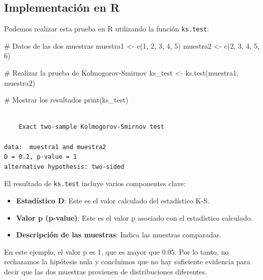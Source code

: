 \documentclass[
  letterpaper,
  DIV=11,
  numbers=noendperiod]{scrreprt}
\newenvironment{Shaded}{\begin{snugshade}}{\end{snugshade}}
\newcommand{\CommentTok}[1]{\textcolor[rgb]{0.37,0.37,0.37}{#1}}
\newcommand{\DecValTok}[1]{\textcolor[rgb]{0.68,0.00,0.00}{#1}}
\newcommand{\FunctionTok}[1]{\textcolor[rgb]{0.28,0.35,0.67}{#1}}
\newcommand{\NormalTok}[1]{\textcolor[rgb]{0.00,0.23,0.31}{#1}}
\newcommand{\OtherTok}[1]{\textcolor[rgb]{0.00,0.23,0.31}{#1}}
\providecommand{\tightlist}{%
  \setlength{\itemsep}{0pt}\setlength{\parskip}{0pt}}\usepackage{longtable,booktabs,array}
\begin{document}
\begin{tcolorbox}
\hypertarget{implementaciuxf3n-en-r}{%
\subsection{Implementación en R}\label{implementaciuxf3n-en-r}}

Podemos realizar esta prueba en R utilizando la función
\texttt{ks.test}:

\begin{Shaded}
\begin{Highlighting}[]
\CommentTok{\# Datos de las dos muestras}
\NormalTok{muestra1 }\OtherTok{\textless{}{-}} \FunctionTok{c}\NormalTok{(}\DecValTok{1}\NormalTok{, }\DecValTok{2}\NormalTok{, }\DecValTok{3}\NormalTok{, }\DecValTok{4}\NormalTok{, }\DecValTok{5}\NormalTok{)}
\NormalTok{muestra2 }\OtherTok{\textless{}{-}} \FunctionTok{c}\NormalTok{(}\DecValTok{2}\NormalTok{, }\DecValTok{3}\NormalTok{, }\DecValTok{4}\NormalTok{, }\DecValTok{5}\NormalTok{, }\DecValTok{6}\NormalTok{)}

\CommentTok{\# Realizar la prueba de Kolmogorov{-}Smirnov}
\NormalTok{ks\_test }\OtherTok{\textless{}{-}} \FunctionTok{ks.test}\NormalTok{(muestra1, muestra2)}

\CommentTok{\# Mostrar los resultados}
\FunctionTok{print}\NormalTok{(ks\_test)}
\end{Highlighting}
\end{Shaded}

\begin{verbatim}

    Exact two-sample Kolmogorov-Smirnov test

data:  muestra1 and muestra2
D = 0.2, p-value = 1
alternative hypothesis: two-sided
\end{verbatim}

El resultado de \texttt{ks.test} incluye varios componentes clave:

\begin{itemize}
\tightlist
\item
  \textbf{Estadístico D}: Este es el valor calculado del estadístico
  K-S.
\item
  \textbf{Valor p (p-value)}: Este es el valor p asociado con el
  estadístico calculado.
\item
  \textbf{Descripción de las muestras}: Indica las muestras comparadas.
\end{itemize}

En este ejemplo, el valor p es 1, que es mayor que \(0.05\). Por lo
tanto, no rechazamos la hipótesis nula y concluimos que no hay
suficiente evidencia para decir que las dos muestras provienen de
distribuciones diferentes.

\end{tcolorbox}
\end{document}
